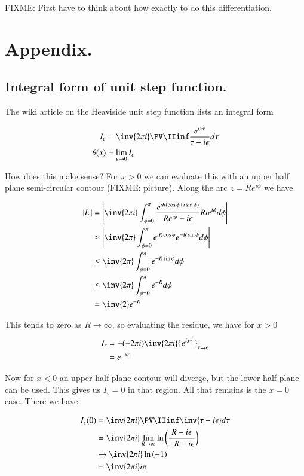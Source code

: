 FIXME: First have to think about how exactly to do this differentiation.

\section{Appendix. }
\subsection{Integral form of unit step function. }

The wiki article on the Heaviside unit step function lists an integral form

\begin{align}
I_\epsilon &= \inv{2\pi i} \PV \IIinf \frac{e^{ix\tau}}{\tau - i\epsilon} d\tau \\
\theta(x) &= \lim_{\epsilon \rightarrow 0} I_\epsilon
\end{align}

How does this make sense?  For $x>0$ we can evaluate this with an upper half plane semi-circular contour (FIXME: picture).  Along the arc $z = R e^{i\phi}$ we have

\begin{align*}
\Abs{I_\epsilon}
&= \Abs{\inv{2\pi i} \int_{\phi=0}^{\pi} \frac{e^{i R (\cos\phi + i \sin\phi)}}{ R e^{i\phi} - i \epsilon} R i e^{i\phi} d\phi} \\
&\approx \Abs{\inv{2\pi} \int_{\phi=0}^{\pi} e^{i R \cos\phi } e^{- R \sin\phi } d\phi} \\
&\le \inv{2\pi} \int_{\phi=0}^{\pi} e^{- R \sin\phi } d\phi \\
&\le \inv{2\pi} \int_{\phi=0}^{\pi} e^{- R } d\phi \\
&= \inv{2} e^{- R } \\
\end{align*}

This tends to zero as $R \rightarrow \infty$, so evaluating the residue, we have for $x > 0$

\begin{align*}
{I_\epsilon}
&= -(-2 \pi i) \inv{2\pi i} {\left. {e^{ix\tau}} \right\vert}_{\tau = i\epsilon} \\
&= e^{-x\epsilon}
\end{align*}

Now for $x<0$ an upper half plane contour will diverge, but the lower half plane can be used.  This gives us $I_\epsilon = 0$ in that region.
All that remains is the $x=0$ case.  There we have

\begin{align*}
I_\epsilon(0)
&= \inv{2\pi i} \PV \IIinf \inv{\tau - i\epsilon} d\tau \\
&= \inv{2\pi i} \lim_{R \rightarrow \infty} \ln\left( \frac{R - i\epsilon} {-R - i\epsilon} \right) \\
& \rightarrow \inv{2\pi i} \ln\left( -1 \right) \\
&= \inv{2\pi i} i \pi \\
\end{align*}

